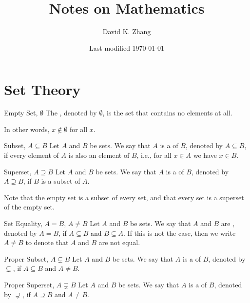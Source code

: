 \documentclass[12pt]{report}
\title{Notes on Mathematics}
\author{David K. Zhang}
\date{Last modified \today}
\begin{document}
\maketitle
{}
\listofdefinition
\clearpage
\listoftheorem
\clearpage
{}



\chapter{Set Theory}

\begin{dfnbox}{Empty Set, $\emptyset$}
	The , denoted by $\emptyset$, is the set that contains no elements at all.
\end{dfnbox}

In other words, $x \notin \emptyset$ for all $x$.

\begin{dfnbox}{Subset, $A \subseteq B$}
	Let $A$ and $B$ be sets. We say that $A$ is a  of $B$, denoted by $A \subseteq B$, if every element of $A$ is also an element of $B$, i.e., for all $x \in A$ we have $x \in B$.
\end{dfnbox}

\begin{dfnbox}{Superset, $A \supseteq B$}
	Let $A$ and $B$ be sets. We say that $A$ is a  of $B$, denoted by $A \supseteq B$, if $B$ is a subset of $A$.
\end{dfnbox}

Note that the empty set is a subset of every set, and that every set is a superset of the empty set.

\begin{dfnbox}{Set Equality, $A = B$, $A \ne B$}
	Let $A$ and $B$ be sets. We say that $A$ and $B$ are , denoted by $A = B$, if $A \subseteq B$ and $B \subseteq A$. If this is not the case, then we write $A \ne B$ to denote that $A$ and $B$ are not equal.
\end{dfnbox}

\begin{dfnbox}{Proper Subset, $A \subsetneq B$}
	Let $A$ and $B$ be sets. We say that $A$ is a  of $B$, denoted by $\subsetneq$, if $A \subseteq B$ and $A \ne B$.
\end{dfnbox}

\begin{dfnbox}{Proper Superset, $A \supsetneq B$}
	Let $A$ and $B$ be sets. We say that $A$ is a  of $B$, denoted by $\supsetneq$, if $A \supseteq B$ and $A \ne B$.
\end{dfnbox}
\end{document}
